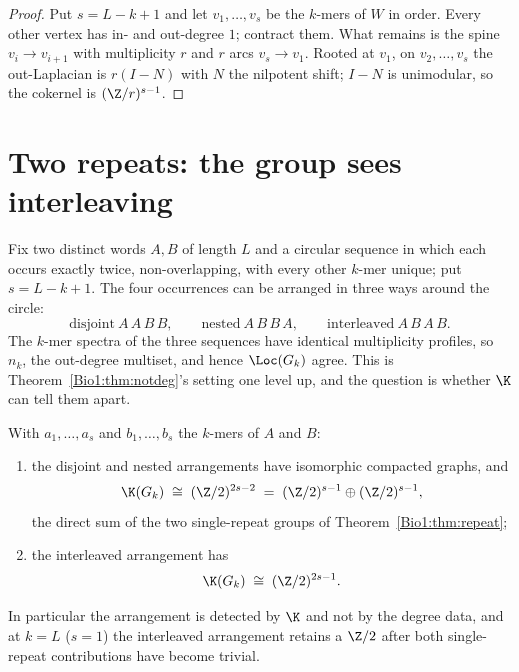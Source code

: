 \begin{proof}
Put $s=L-k+1$ and let $v_1,\dots,v_s$ be the $k$-mers of $W$ in order. Every other vertex
has in- and out-degree $1$; contract them. What remains is the spine $v_i\to v_{i+1}$ with
multiplicity $r$ and $r$ arcs $v_s\to v_1$. Rooted at $v_1$, on $v_2,\dots,v_s$ the
out-Laplacian is $r(I-N)$ with $N$ the nilpotent shift; $I-N$ is unimodular, so the
cokernel is $(\Z/r)^{s-1}$.
\end{proof}

\section{Two repeats: the group sees interleaving}\label{Bio1:sec:interleave}

Fix two distinct words $A,B$ of length $L$ and a circular sequence in which each occurs
exactly twice, non-overlapping, with every other $k$-mer unique; put $s=L-k+1$. The four
occurrences can be arranged in three ways around the circle:
\[
\text{disjoint}\ A\,A\,B\,B,\qquad \text{nested}\ A\,B\,B\,A,\qquad
\text{interleaved}\ A\,B\,A\,B.
\]
The $k$-mer spectra of the three sequences have identical multiplicity profiles, so
$n_k$, the out-degree multiset, and hence $\Loc(G_k)$ agree. This is Theorem~\ref{Bio1:thm:notdeg}'s
setting one level up, and the question is whether $\K$ can tell them apart.

\begin{theorem}\label{Bio1:thm:interleave}
With $a_1,\dots,a_s$ and $b_1,\dots,b_s$ the $k$-mers of $A$ and $B$:
\begin{enumerate}
\item[(i)] the disjoint and nested arrangements have isomorphic compacted graphs, and
\[
\K(G_k)\;\cong\;(\Z/2)^{2s-2}\;=\;(\Z/2)^{s-1}\oplus(\Z/2)^{s-1},
\]
the direct sum of the two single-repeat groups of Theorem~\ref{Bio1:thm:repeat};
\item[(ii)] the interleaved arrangement has
\[
\K(G_k)\;\cong\;(\Z/2)^{2s-1}.
\]
\end{enumerate}
In particular the arrangement is detected by $\K$ and not by the degree data, and at
$k=L$ ($s=1$) the interleaved arrangement retains a $\Z/2$ after both single-repeat
contributions have become trivial.
\end{theorem}

